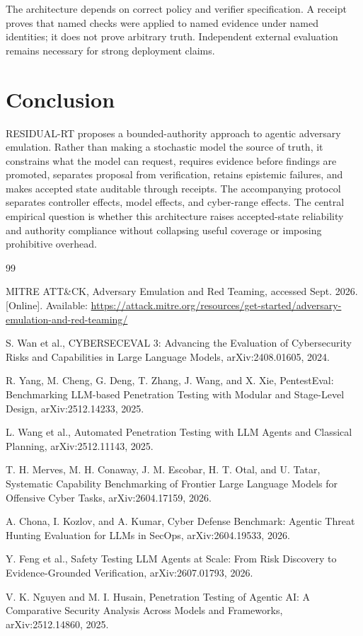 \documentclass[conference]{IEEEtran}
\begin{document}
The architecture depends on correct policy and verifier specification. A receipt proves that named checks were applied to named evidence under named identities; it does not prove arbitrary truth. Independent external evaluation remains necessary for strong deployment claims.

\section{Conclusion}
RESIDUAL-RT proposes a bounded-authority approach to agentic adversary emulation. Rather than making a stochastic model the source of truth, it constrains what the model can request, requires evidence before findings are promoted, separates proposal from verification, retains epistemic failures, and makes accepted state auditable through receipts. The accompanying protocol separates controller effects, model effects, and cyber-range effects. The central empirical question is whether this architecture raises accepted-state reliability and authority compliance without collapsing useful coverage or imposing prohibitive overhead.

\begin{thebibliography}{99}

MITRE ATT\&CK, Adversary Emulation and Red Teaming, accessed Sept. 2026. [Online]. Available: \url{https://attack.mitre.org/resources/get-started/adversary-emulation-and-red-teaming/}

S. Wan et al., CYBERSECEVAL 3: Advancing the Evaluation of Cybersecurity Risks and Capabilities in Large Language Models, arXiv:2408.01605, 2024.

R. Yang, M. Cheng, G. Deng, T. Zhang, J. Wang, and X. Xie, PentestEval: Benchmarking LLM-based Penetration Testing with Modular and Stage-Level Design, arXiv:2512.14233, 2025.

L. Wang et al., Automated Penetration Testing with LLM Agents and Classical Planning, arXiv:2512.11143, 2025.

T. H. Merves, M. H. Conaway, J. M. Escobar, H. T. Otal, and U. Tatar, Systematic Capability Benchmarking of Frontier Large Language Models for Offensive Cyber Tasks, arXiv:2604.17159, 2026.

A. Chona, I. Kozlov, and A. Kumar, Cyber Defense Benchmark: Agentic Threat Hunting Evaluation for LLMs in SecOps, arXiv:2604.19533, 2026.

Y. Feng et al., Safety Testing LLM Agents at Scale: From Risk Discovery to Evidence-Grounded Verification, arXiv:2607.01793, 2026.

V. K. Nguyen and M. I. Husain, Penetration Testing of Agentic AI: A Comparative Security Analysis Across Models and Frameworks, arXiv:2512.14860, 2025.

\end{thebibliography}
\end{document}
